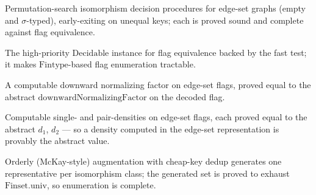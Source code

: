 \begin{definition}
  \label{def:fast-iso}
  \leanok
  Permutation-search isomorphism decision procedures for edge-set graphs (empty
  and $\sigma$-typed), early-exiting on unequal keys; each is proved sound and
  complete against flag equivalence.
\end{definition}

\begin{definition}
  \label{def:fast-iso-decidable}
  \leanok
  The high-priority $\mathrm{Decidable}$ instance for flag equivalence backed by
  the fast test; it makes $\mathrm{Fintype}$-based flag enumeration tractable.
\end{definition}

\begin{theorem}
  \label{thm:downward-compute}
  \leanok
  A computable downward normalizing factor on edge-set flags, proved equal to the
  abstract $\mathrm{downwardNormalizingFactor}$ on the decoded flag.
\end{theorem}

\begin{theorem}
  \label{thm:density-compute}
  \leanok
  Computable single- and pair-densities on edge-set flags, each proved equal to
  the abstract $d_1$, $d_2$ --- so a density computed in the edge-set
  representation is provably the abstract value.
\end{theorem}

\begin{theorem}
  \label{thm:flag-enumeration}
  \leanok
  Orderly (McKay-style) augmentation with cheap-key dedup generates one
  representative per isomorphism class; the generated set is proved to exhaust
  $\mathrm{Finset.univ}$, so enumeration is complete.
\end{theorem}

